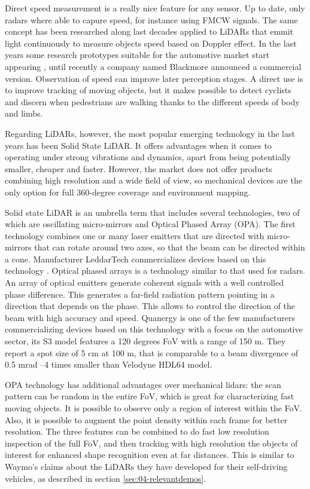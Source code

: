 Direct speed measurement is a really nice feature for any sensor. Up to date,
only radars where able to capure speed, for instance using FMCW signals.
The same concept has been researched along last decades \cite{Nordin2004}
applied to LiDARs that emmit light continuously to measure objects speed based 
on Doppler effect. In the last years some research prototypes suitable for
the automotive market start appearing \cite{Poulton2016}, until recently
a company named Blackmore announced a commercial version. 
Observation of speed can improve later perception stages. A direct use is to
improve tracking of moving objects, but it makes possible to detect cyclists 
and discern when pedestrians are walking thanks to the different speeds of
body and limbs.

Regarding LiDARs, however, the most popular emerging technology in the last 
years has been Solid State LiDAR. It offers advantages when it comes
to operating under strong vibrations and dynamics, apart from being potentially
smaller, cheaper and faster. 
However, the market does not offer products combining high resolution and a 
wide field of view, so mechanical devices are the only option for full 
360-degree coverage and environment mapping.

Solid state LiDAR is an umbrella term that includes several technologies, two 
of which are oscillating micro-mirrors and Optical Phased Array (OPA).
The first technology combines one or many laser emitters that are directed
with micro-mirrors that can rotate around two axes, so that the beam 
can be directed within a cone. Manufacturer LeddarTech commercializes devices
based on this technology \cite{LeddarTech2016}.
Optical phased arrays \cite{McManamon1996} is a technology similar to that used 
for radars. An array of optical emitters generate coherent signals with a well
controlled phase difference. This generates a far-field radiation pattern 
pointing in a direction that depends on the phase. This allows to control the 
direction of the beam with high accuracy and speed. Quanergy \cite{Eldada2017} 
is one of the few manufacturers commercializing devices based on this technology
with a focus on the automotive sector, its S3 model features a 120 degrees FoV
with a range of 150 m. They report a spot size of 5 cm at 100 m, that is 
comparable to a beam divergence of 0.5 mrad --4 times smaller than Velodyne 
HDL64 model.

OPA technology has additional advantages over mechanical lidars: the scan 
pattern can be random in the entire FoV, which is great for characterizing fast 
moving objects. It is possible to observe only a region of interest within the 
FoV. Also, it is possible to augment the point density within each frame for 
better resolution. The three features can be combined to do fast low resolution 
inspection of the full FoV, and then tracking with high resolution the objects
of interest for enhanced shape recognition even at far distances.
This is similar to Waymo's claims about the LiDARs they have developed for their
self-driving vehicles, as described in section \ref{sec:04-relevantdemos}.

